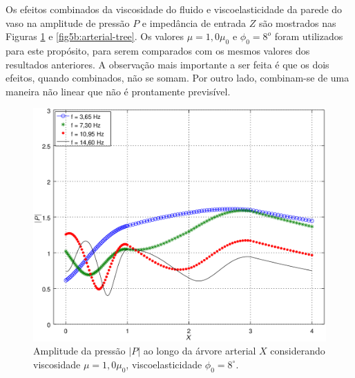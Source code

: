 \documentclass[a4paper,12pt]{monografia}
\theoremstyle{plain}
\theoremstyle{definition}
\theoremstyle{remark}
\begin{document}
Os efeitos combinados da viscosidade do fluido e viscoelasticidade da parede do vaso na amplitude de pressão $P$ e impedância de entrada $Z$ são mostrados nas Figuras \ref{fig5a:arterial-tree} e \ref{fig5b:arterial-tree}. Os valores $\mu = 1,0 \mu_0$ e $\phi_0 = 8^o$ foram utilizados para este propósito, para serem comparados com os mesmos valores dos resultados anteriores. A observação mais importante a ser feita é que os dois efeitos, quando combinados, não se somam. Por outro lado, combinam-se de uma maneira não linear que não é prontamente previsível.

\begin{figure}[!htbp]
	\centering
	\includegraphics[scale=0.7]{figure5-result-new/Fig5_P_visc1_phi8_new2.png}
	\caption{Amplitude da pressão $|P|$ ao longo da árvore arterial $X$ considerando viscosidade $\mu = 1,0 \mu_0$, viscoelasticidade $\phi_0 = 8^{\circ}$.}
	\label{fig5a:arterial-tree}%
\end{figure}
\end{document}
